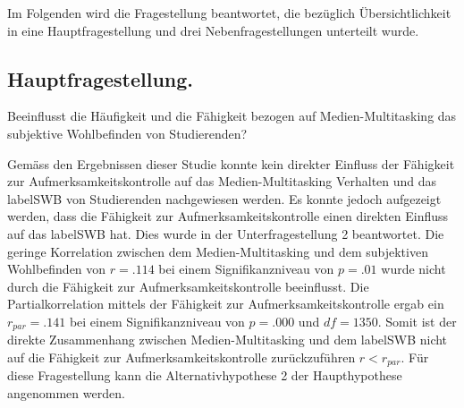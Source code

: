 %
%
\glsresetall
\let\raggedsection\centering
{}
\setcounter{chapter}{4}
\setcounter{section}{0}
\let\raggedsection\raggedright 

\label{section.diskussion.fragestellung}
Im Folgenden wird die Fragestellung beantwortet, die bezüglich Übersichtlichkeit in eine Hauptfragestellung und drei Nebenfragestellungen unterteilt wurde. 
\par
\subsection{Hauptfragestellung.} Beeinflusst die Häufigkeit und die Fähigkeit bezogen auf Medien-Multitasking das subjektive Wohlbefinden von Studierenden?
\par
Gemäss den Ergebnissen dieser Studie konnte kein direkter Einfluss der Fähigkeit zur Aufmerksamkeitskontrolle auf das Medien-Multitasking Verhalten und das \gls{labelSWB} von Studierenden nachgewiesen werden. Es konnte jedoch aufgezeigt werden, dass die Fähigkeit zur Aufmerksamkeitskontrolle einen direkten Einfluss auf das \gls{labelSWB} hat. Dies wurde in der Unterfragestellung 2 beantwortet. Die geringe Korrelation zwischen dem Medien-Multitasking und dem subjektiven Wohlbefinden von $r=.114$ bei einem Signifikanzniveau von $p=.01$ wurde nicht durch die Fähigkeit zur Aufmerksamkeitskontrolle beeinflusst. Die Partialkorrelation mittels der Fähigkeit zur Aufmerksamkeitskontrolle ergab ein $r_{par}=.141$ bei einem Signifikanzniveau von $p=.000$ und $df=1350$. Somit ist der direkte Zusammenhang zwischen Medien-Multitasking und dem \gls{labelSWB} nicht auf die Fähigkeit zur Aufmerksamkeitskontrolle zurückzuführen $r<r_{par}$. Für diese Fragestellung kann die Alternativhypothese 2 der Haupthypothese angenommen werden.

